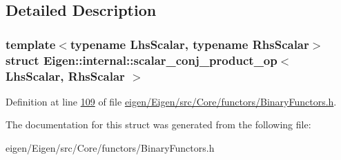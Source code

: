 \subsection{Detailed Description}
\subsubsection*{template$<$typename Lhs\+Scalar, typename Rhs\+Scalar$>$\newline
struct Eigen\+::internal\+::scalar\+\_\+conj\+\_\+product\+\_\+op$<$ Lhs\+Scalar, Rhs\+Scalar $>$}



Definition at line \hyperlink{eigen_2_eigen_2src_2_core_2functors_2_binary_functors_8h_source_l00109}{109} of file \hyperlink{eigen_2_eigen_2src_2_core_2functors_2_binary_functors_8h_source}{eigen/\+Eigen/src/\+Core/functors/\+Binary\+Functors.\+h}.



The documentation for this struct was generated from the following file\+:\begin{DoxyCompactItemize}
\item 
eigen/\+Eigen/src/\+Core/functors/\+Binary\+Functors.\+h\end{DoxyCompactItemize}
